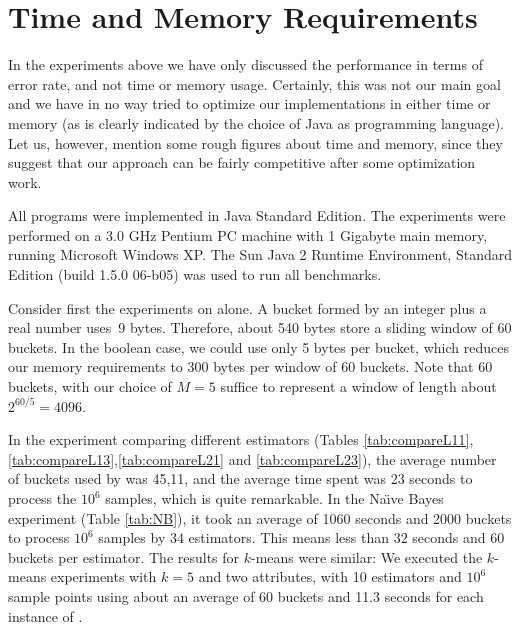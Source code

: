 %

\section{Time and Memory Requirements}

In the experiments above we have only discussed
the performance in terms of error rate, and not 
time or memory usage. Certainly, this was not our main goal
and we have in no way tried to optimize 
our implementations in either time or memory (as is clearly indicated
by the choice of Java as programming language). 
Let us, however, mention some rough figures about time and memory, 
since they suggest that our approach can be fairly competitive 
after some optimization work. 

All programs were implemented in Java Standard Edition.
The experiments were performed on a 3.0 GHz Pentium PC machine with 1 Gigabyte main memory,
running Microsoft Windows XP.  The Sun Java 2 Runtime Environment, Standard Edition
(build 1.5.0 06-b05) was used to run all benchmarks.

Consider first the experiments on \adwintwo alone. 
A bucket formed by an integer plus a real number uses~9 bytes. Therefore, 
about 540 bytes store a sliding window of 60 buckets. 
In the boolean case, we could use only 5 bytes per bucket, 
which reduces our memory requirements to 300 bytes per window of 60 buckets.
Note that 60 buckets, with our choice of $M=5$ suffice to represent a window
of length about $2^{60/5} = 4096$. 

In the experiment comparing different estimators (Tables \ref{tab:compareL11},\ref{tab:compareL13},\ref{tab:compareL21} and \ref{tab:compareL23}), 
the average number of buckets used by \adwintwo was 45,11, and the average time spent was 23 seconds 
to process the $10^6$ samples, which is quite remarkable.
In the Na\"{\i}ve Bayes experiment (Table \ref{tab:NB}), 
it took an average of 1060 seconds and 2000 buckets to process $10^6$ samples
by $34$ estimators. 
This means less than $32$ seconds and $60$ buckets per estimator. 
The results for $k$-means were similar: We executed the $k$-means
experiments with $k=5$ and two attributes, with 10 estimators and $10^6$ sample points using
about an average of 60 buckets and 11.3 seconds for each instance of \adwintwoz.

